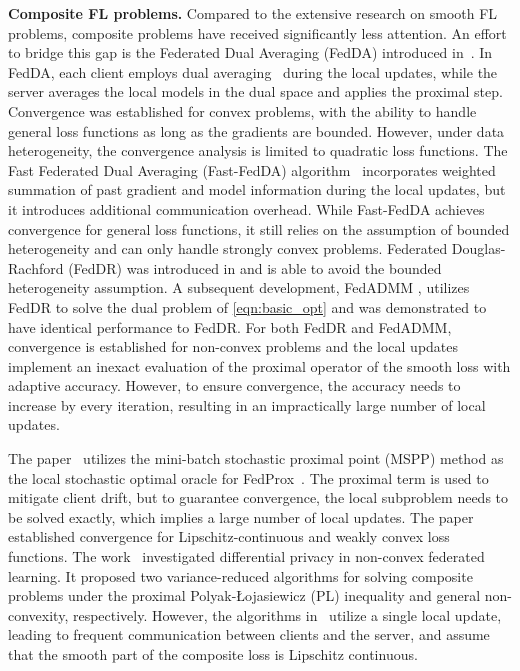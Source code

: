 {\bf Composite FL problems.} 
Compared to the extensive research on smooth FL problems,  composite problems have received significantly less attention. An effort to bridge this gap is the Federated Dual Averaging (FedDA) introduced in~\cite{yuan2021federated}. In FedDA, each client employs dual averaging~\cite{nesterov2009primal} during the local updates,  while the server averages the local models in the dual space and applies the proximal step. 
Convergence was established for convex problems, with the ability to handle general loss functions as long as the gradients are bounded. However, under data heterogeneity, the convergence analysis is limited to quadratic loss functions.
%
The Fast Federated Dual Averaging (Fast-FedDA) algorithm~\cite{bao2022fast} incorporates weighted summation of past gradient and model information during the local updates, but it introduces additional communication overhead.  While Fast-FedDA achieves convergence for general loss functions, it still relies on the assumption of bounded heterogeneity and can only handle strongly convex problems.
%
Federated Douglas-Rachford (FedDR) was introduced in \cite{tran2021feddr} and is able to avoid the bounded heterogeneity assumption. A subsequent development, FedADMM \cite{wang2022fedadmm}, utilizes FedDR to solve the dual problem of \eqref{eqn:basic_opt} and was demonstrated to have identical performance to FedDR. 
%
For both FedDR and FedADMM, convergence is established for non-convex problems and the local updates implement an inexact evaluation of the proximal operator of the smooth loss with adaptive accuracy. However, to ensure convergence, the accuracy needs to increase by every iteration, resulting in an impractically large number of local updates.

{The paper~\cite{c3} utilizes the mini-batch stochastic proximal point (MSPP) method as the local
stochastic optimal oracle for FedProx~\cite{li2020federated-fedprox}. The proximal term is used to mitigate client drift, but to guarantee convergence, the local subproblem needs to be solved exactly, which implies a large number of local updates. The paper~\cite{c3} established convergence 
for Lipschitz-continuous and weakly convex loss functions.
The work~\cite{c2} investigated differential privacy in non-convex federated learning. It proposed two variance-reduced algorithms for solving composite problems under the proximal Polyak-{\L}ojasiewicz (PL) inequality and general non-convexity, respectively. However, the algorithms in~\cite{c2} utilize a single local update, leading to frequent communication between clients and the server, and
assume that the smooth part of the composite loss is Lipschitz continuous. }